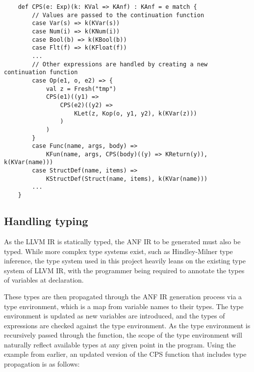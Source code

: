 \begin{verbatim}
    def CPS(e: Exp)(k: KVal => KAnf) : KAnf = e match {
        // Values are passed to the continuation function
        case Var(s) => k(KVar(s))
        case Num(i) => k(KNum(i))
        case Bool(b) => k(KBool(b))
        case Flt(f) => k(KFloat(f))
        ...
        // Other expressions are handled by creating a new continuation function
        case Op(e1, o, e2) => {
            val z = Fresh("tmp")
            CPS(e1)((y1) =>
                CPS(e2)((y2) =>
                    KLet(z, Kop(o, y1, y2), k(KVar(z)))
                )
            )
        }
        case Func(name, args, body) =>
            KFun(name, args, CPS(body)((y) => KReturn(y)), k(KVar(name)))
        case StructDef(name, items) =>
            KStructDef(Struct(name, items), k(KVar(name)))
        ...
    }
\end{verbatim}

\subsection{Handling typing}

As the LLVM IR is statically typed, the ANF IR to be generated must also be typed. While more
complex type systems exist, such as Hindley-Milner type inference, the type system used in this
project heavily leans on the existing type system of LLVM IR, with the programmer being required to
annotate the types of variables at declaration.

These types are then propagated through the ANF IR generation process via a type environment, which
is a map from variable names to their types. The type environment is updated as new variables are
introduced, and the types of expressions are checked against the type environment. As the type
environment is recursively passed through the function, the scope of the type environment will
naturally reflect available types at any given point in the program. Using the example from earlier,
an updated version of the CPS function that includes type propagation is as follows:

